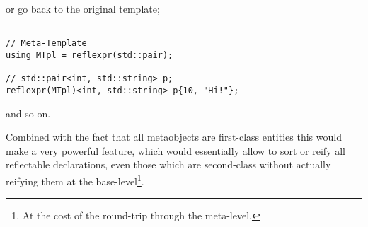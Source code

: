 or go back to the original template;

\begin{verbatim}

// Meta-Template
using MTpl = reflexpr(std::pair);

// std::pair<int, std::string> p;
reflexpr(MTpl)<int, std::string> p{10, "Hi!"};

\end{verbatim}

and so on.

Combined with the fact that all metaobjects are first-class
entities this would make a very powerful feature, which would essentially
allow to sort or reify all reflectable declarations, even those which are
second-class without actually reifying them at the base-level\footnote{
At the cost of the round-trip through the meta-level.}.
